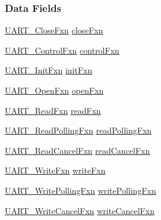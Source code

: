 \subsubsection*{Data Fields}
\begin{DoxyCompactItemize}
\item 
\hyperlink{_u_a_r_t_8h_ae08ff15291bd6b21cb4e2eb1fce164a6}{U\+A\+R\+T\+\_\+\+Close\+Fxn} \hyperlink{struct_u_a_r_t___fxn_table_ab21579c919ae5ebfc3180358d7439787}{close\+Fxn}
\item 
\hyperlink{_u_a_r_t_8h_a4fc98447e6dd805e2d072917e8e6da3b}{U\+A\+R\+T\+\_\+\+Control\+Fxn} \hyperlink{struct_u_a_r_t___fxn_table_a350e08db86d6de3e45e950d077208df6}{control\+Fxn}
\item 
\hyperlink{_u_a_r_t_8h_a2b3e89df3065fffb47e7354067c14d1b}{U\+A\+R\+T\+\_\+\+Init\+Fxn} \hyperlink{struct_u_a_r_t___fxn_table_a56e1ef00843055476e9b88a510a801d7}{init\+Fxn}
\item 
\hyperlink{_u_a_r_t_8h_a39e21ac60f24eb9ce32286e21de713d1}{U\+A\+R\+T\+\_\+\+Open\+Fxn} \hyperlink{struct_u_a_r_t___fxn_table_afd53378ea35fb42710bcf5520acf05fa}{open\+Fxn}
\item 
\hyperlink{_u_a_r_t_8h_a4d855b637a26d787afec822d4cd2978e}{U\+A\+R\+T\+\_\+\+Read\+Fxn} \hyperlink{struct_u_a_r_t___fxn_table_ac4cc1fdecea3b36d525034122a84d4ee}{read\+Fxn}
\item 
\hyperlink{_u_a_r_t_8h_a6b57fb6a7c48272141a727c7de7290e4}{U\+A\+R\+T\+\_\+\+Read\+Polling\+Fxn} \hyperlink{struct_u_a_r_t___fxn_table_a42eee2074bfa5ec52aba695227935e3d}{read\+Polling\+Fxn}
\item 
\hyperlink{_u_a_r_t_8h_aa46296acc2c197a775d44458e1eca197}{U\+A\+R\+T\+\_\+\+Read\+Cancel\+Fxn} \hyperlink{struct_u_a_r_t___fxn_table_ab2799a9e8d84457fa842b66965d93ceb}{read\+Cancel\+Fxn}
\item 
\hyperlink{_u_a_r_t_8h_abe7ee32e202ad90d912b27693fe33672}{U\+A\+R\+T\+\_\+\+Write\+Fxn} \hyperlink{struct_u_a_r_t___fxn_table_a91feea9956f15f89d8def60d79bf0ece}{write\+Fxn}
\item 
\hyperlink{_u_a_r_t_8h_a68d0b77abdb9da6a868edc6529ae70ff}{U\+A\+R\+T\+\_\+\+Write\+Polling\+Fxn} \hyperlink{struct_u_a_r_t___fxn_table_a3339c9996ef55652fd500e3958ed2dc2}{write\+Polling\+Fxn}
\item 
\hyperlink{_u_a_r_t_8h_ac5a3d974279a2d161746dfbc8ca91774}{U\+A\+R\+T\+\_\+\+Write\+Cancel\+Fxn} \hyperlink{struct_u_a_r_t___fxn_table_a5eb722a7231589656f26cb1e8b06095e}{write\+Cancel\+Fxn}
\end{DoxyCompactItemize}


